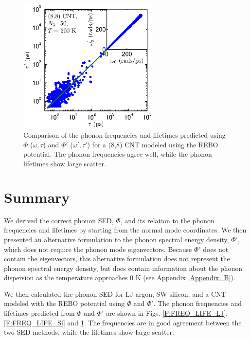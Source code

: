 \documentclass[aps,prb,preprint,superscriptaddress,amsmath,amssymb,floatfix]{revtex4}
\begin{document}
\begin{figure}
\begin{center}
\includegraphics[angle=0,width=70.0mm]{NMD_SED_CNT_LIFE_5.eps}
\vspace*{-5mm}
\end{center}
\caption{\label{F:FREQ_LIFE_CNT} Comparison of the phonon frequencies and lifetimes predicted using $\Phi$ ($\omega,\tau$) and $\Phi'$ ($\omega',\tau'$) for a (8,8) CNT modeled using the REBO potential. The phonon frequencies agree well, while the phonon lifetimes show large scatter.}
\end{figure}

\vspace*{0mm}

\section{\label{Section_Conclusions}Summary}

We derived the correct phonon SED, $\Phi$, and its relation to the phonon frequencies and lifetimes by starting from the normal mode coordinates. We then presented an alternative formulation to the phonon spectral energy density, $\Phi'$, which does not require the phonon mode eigenvectors.  Because $\Phi'$ does not contain the eigenvectors, this alternative formulation does not represent the phonon spectral energy density, but does contain information about the phonon dispersion as the temperature approaches $0$ K (see Appendix \ref{Appendix_B}).

We then calculated the phonon SED for LJ argon, SW silicon, and a CNT modeled with the REBO potential using $\Phi$ and $\Phi'$. The phonon frequencies and
lifetimes predicted from $\Phi$ and $\Phi'$ are shown in Figs$.$ \ref{F:FREQ_LIFE_LJ}, \ref{F:FREQ_LIFE_Si} and \ref{F:FREQ_LIFE_CNT}. The
frequencies are in good agreement between the two SED methods, while the lifetimes show large scatter.
\end{document}
